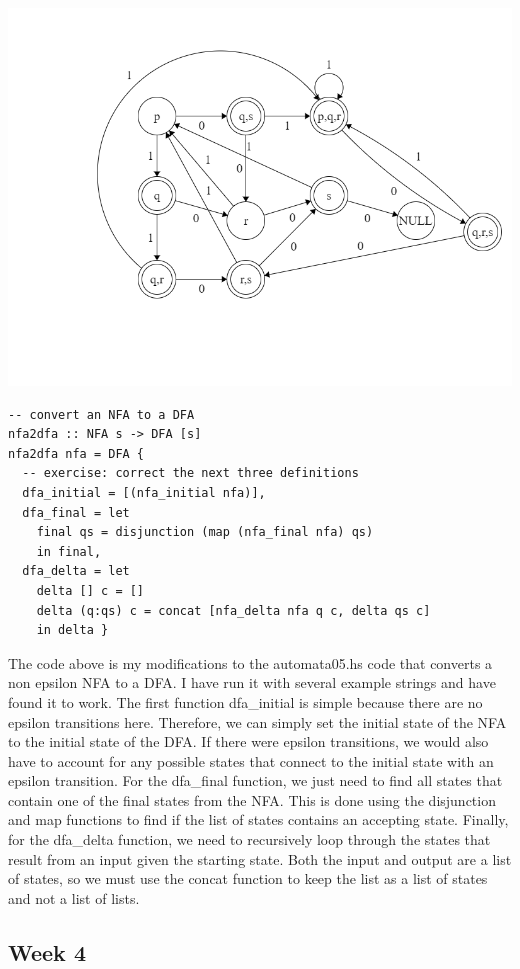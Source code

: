 \documentclass{article}
\theoremstyle{theorem}
\theoremstyle{definition}
\theoremstyle{remark}
\begin{document}
\includegraphics[scale=0.4]{Images/2.3.2.png}

\begin{lstlisting}
-- convert an NFA to a DFA
nfa2dfa :: NFA s -> DFA [s]
nfa2dfa nfa = DFA {
  -- exercise: correct the next three definitions 
  dfa_initial = [(nfa_initial nfa)],
  dfa_final = let
    final qs = disjunction (map (nfa_final nfa) qs)
    in final,
  dfa_delta = let
    delta [] c = []
    delta (q:qs) c = concat [nfa_delta nfa q c, delta qs c]
    in delta }
\end{lstlisting}

The code above is my modifications to the automata05.hs code that converts a non epsilon NFA to a DFA. I have run it with several example strings and have found it to work. The first function dfa\_initial is simple because there are no epsilon transitions here. Therefore, we can simply set the initial state of the NFA to the initial state of the DFA. If there were epsilon transitions, we would also have to account for any possible states that connect to the initial state with an epsilon transition. For the dfa\_final function, we just need to find all states that contain one of the final states from the NFA. This is done using the disjunction and map functions to find if the list of states contains an accepting state. Finally, for the dfa\_delta function, we need to recursively loop through the states that result from an input given the starting state. Both the input and output are a list of states, so we must use the concat function to keep the list as a list of states and not a list of lists.

\subsection{Week 4}
\end{document}
